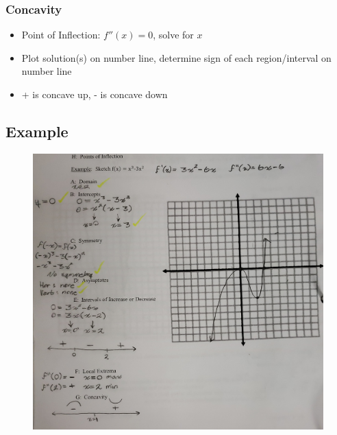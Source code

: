 \documentclass[a4paper,12pt]{article}
\begin{document}
\subsubsection{Concavity}
\begin{itemize}
    \item{Point of Inflection: $f''(x) = 0$, solve for $x$}
    \item{Plot solution(s) on number line, determine sign of each region/interval on number line}
    \item{+ is concave up, - is concave down}
\end{itemize}

\subsection{Example}
\begin{figure}[H]
    \centering
    \includegraphics[width=\textwidth]{eg}
\end{figure}
\end{document}
